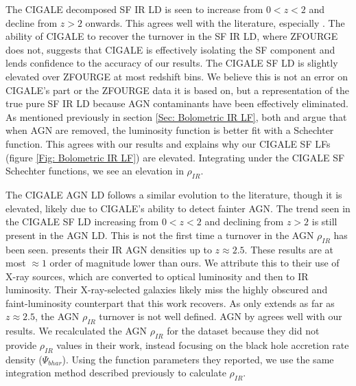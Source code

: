 The CIGALE decomposed SF IR LD is seen to increase from $0<z<2$ and decline from $z>2$ onwards. This agrees well with the literature, especially \cite{madau_cosmic_2014}. The ability of CIGALE to recover the turnover in the SF IR LD, where ZFOURGE does not, suggests that CIGALE is effectively isolating the SF component and lends confidence to the accuracy of our results. The CIGALE SF LD is slightly elevated over ZFOURGE at most redshift bins. We believe this is not an error on CIGALE's part or the ZFOURGE data it is based on, but a representation of the true pure SF IR LD because AGN contaminants have been effectively eliminated. As mentioned previously in section \ref{Sec: Bolometric IR LF}, both \cite{fu_decomposing_2010} and \cite{wu_mid-infrared_2011} argue that when AGN are removed, the luminosity function is better fit with a Schechter function. This agrees with our results and explains why our CIGALE SF LFs (figure \ref{Fig: Bolometric IR LF}) are elevated. Integrating under the CIGALE SF Schechter functions, we see an elevation in $\rho_{IR}$. 

The CIGALE AGN LD follows a similar evolution to the literature, though it is elevated, likely due to CIGALE's ability to detect fainter AGN. The trend seen in the CIGALE SF LD increasing from $0<z<2$ and declining from $z>2$ is still present in the AGN LD. This is not the first time a turnover in the AGN $\rho_{IR}$ has been seen. \cite{symeonidis_agn_2021} presents their IR AGN densities up to $z\approx2.5$. These results are at most $\approx 1$ order of magnitude lower than ours. We attribute this to their use of \cite{aird_evolution_2015} X-ray sources, which are converted to optical luminosity and then to IR luminosity. Their X-ray-selected galaxies likely miss the highly obscured and faint-luminosity counterpart that this work recovers. As \cite{symeonidis_agn_2021} only extends as far as $z\approx2.5$, the AGN $\rho_{IR}$ turnover is not well defined. AGN by \cite{delvecchio_tracing_2014} agrees well with our results. We recalculated the AGN $\rho_{IR}$ for the \cite{delvecchio_tracing_2014} dataset because they did not provide $\rho_{IR}$ values in their work, instead focusing on the black hole accretion rate density ($\Psi_{bhar}$). Using the function parameters they reported, we use the same integration method described previously to calculate $\rho_{IR}$.

